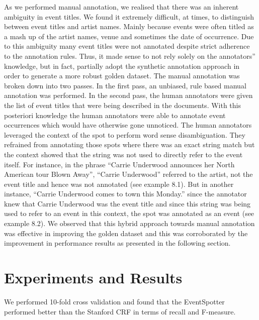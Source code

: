 \documentclass[10pt,a4paper]{article}
\begin{document}
As we performed manual annotation, we realised that there was an inherent ambiguity in event titles. We found it extremely difficult, at times, to distinguish between event titles and artist names. Mainly because events were often titled as a mash up of the artist names, venue and sometimes the date of occurrence. Due to this ambiguity many event titles were not annotated despite strict adherence to the annotation rules. Thus, it made sense to not rely solely on the annotators'' knowledge, but in fact, partially adopt the synthetic annotation approach in order to generate a more robust golden dataset. The manual annotation was broken down into two passes. In the first pass, an unbiased, rule based manual annotation was performed. In the second pass, the human annotators were given the list of event titles that were being described in the documents. With this posteriori knowledge the human annotators were able to annotate event occurrences which would have otherwise gone unnoticed. The human annotators leveraged the context of the spot to perform word sense disambiguation. They refrained from annotating those spots where there was an exact string match but the context showed that the string was not used to directly refer to the event itself. For instance, in the phrase ``Carrie Underwood announces her North American tour Blown Away'', ``Carrie Underwood'' referred to the artist, not the event title and hence was not annotated (see example 8.1). But in another instance, ``Carrie Underwood comes to town this Monday.'' since the annotator knew that Carrie Underwood was the event title and since this string was being used to refer to an event in this context, the spot was annotated as an event (see example 8.2). We observed that this hybrid approach towards manual annotation was effective in improving the golden dataset and this was corroborated by the improvement in performance results as presented in the following section.

{\color{red}{A+M:Details of the dataset (see how to explain the differences between synthetic and manual.}}

{\color{red}{A+M:create a table with the stats of the dataset, i.e. number of token etc. etc.}}

{\color{red}{A+M:point to the dataset (GitHub URI).}}

\section{Experiments and Results}
We performed 10-fold cross validation and found that the EventSpotter performed better than the Stanford CRF in terms of recall and F-measure.
\end{document}
